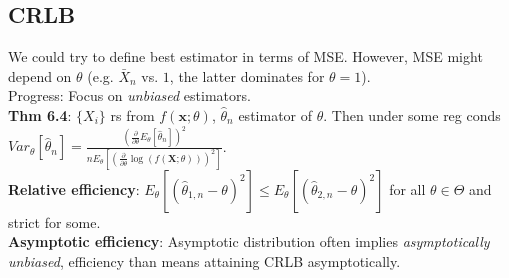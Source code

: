 \subsection{CRLB}
We could try to define best estimator in terms of MSE. However, MSE might depend on $\theta$ (e.g. $\bar{X}_n$ vs. $1$, the latter dominates for $\theta = 1$).\\
Progress: Focus on \textit{unbiased} estimators.\\
\textbf{Thm 6.4}: $\{X_i\}$ rs from $f(\textbf{x};\theta)$, $\hat{\theta}_n$ estimator of $\theta$. Then under some reg conds $Var_\theta[\hat{\theta}_n] = \frac{(\frac{\partial}{\partial\theta}E_\theta[\hat{\theta}_n])^2}{nE_\theta[(\frac{\partial}{\partial\theta}\log(f(\textbf{X};\theta)))^2]}$.\\
\textbf{Relative efficiency}: $E_\theta[(\hat{\theta}_{1,n}-\theta)^2] \leq E_\theta[(\hat{\theta}_{2,n}-\theta)^2]$ for all $\theta\in\Theta$ and strict for some.\\
\textbf{Asymptotic efficiency}: Asymptotic distribution often implies \textit{asymptotically unbiased}, efficiency than means attaining CRLB asymptotically. %